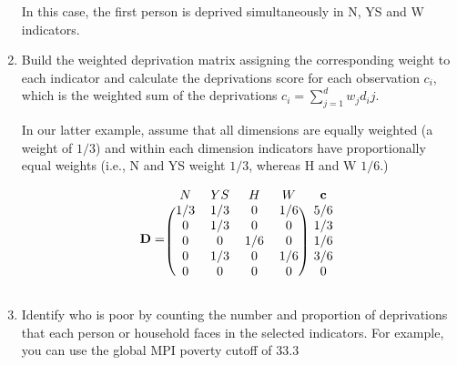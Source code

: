 \begin{enumerate}
In this case, the first person is deprived simultaneously in N, YS and W indicators.

\item Build the weighted deprivation matrix assigning the corresponding weight to each indicator and calculate the deprivations score for each observation $c_i$, which is the weighted sum of the deprivations $c_i = \sum_{j=1}^d w_j d_ij$.

In our latter example, assume that all dimensions are equally weighted (a weight of $1/3$) and within each dimension indicators have proportionally equal weights (i.e., N and YS weight $1/3$, whereas H and W $1/6$.)

\[ \mathbf{D} = 
\begin{blockarray}{ccccc}
N & YS & H & W & \bf{c}\\
\begin{block}{(cccc)c}
  1/3 & 1/3 & 0 & 1/6 & 5/6\\
  0 & 1/3 & 0 & 0 & 1/3\\
  0 & 0 & 1/6 & 0 & 1/6\\
  0 & 1/3 & 0 & 1/6 & 3/6\\
  0 & 0 & 0 & 0 & 0\\
\end{block}
\end{blockarray}
\]

\item Identify who is poor by counting the number and proportion of deprivations that each person or household faces in the selected indicators. For example, you can use the global MPI poverty cutoff of 33.3%


\end{enumerate}
